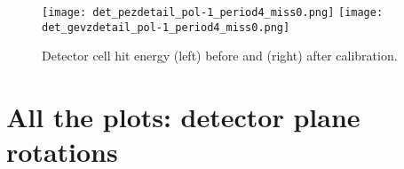  \begin{figure}	   
 \centering
  \texttt{[image: det\_pezdetail\_pol-1\_period4\_miss0.png]}
   \texttt{[image: det\_gevzdetail\_pol-1\_period4\_miss0.png]}
  \caption{Detector cell hit energy (left) before and (right) after calibration.}			
   \label{fig_detenergyz}
  \end{figure}
%  
%    
%
%
%
%
%
%


%
%
\section{All the plots: detector plane rotations}\label{app_fit_XY}

